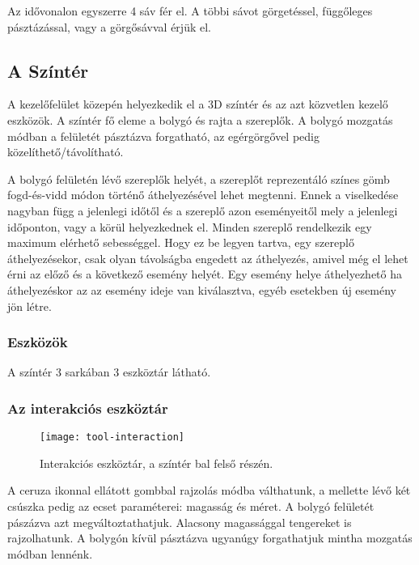 Az idővonalon egyszerre 4 sáv fér el. A többi sávot görgetéssel, függőleges pásztázással, vagy a görgősávval érjük el.

\subsection{A Színtér} \label{section:ui-scene}

A kezelőfelület közepén helyezkedik el a 3D színtér és az azt közvetlen kezelő eszközök. A színtér fő eleme a bolygó és rajta a szereplők. A bolygó mozgatás módban a felületét pásztázva forgatható, az egérgörgővel pedig közelíthető/távolítható.

A bolygó felületén lévő szereplők helyét, a szereplőt reprezentáló színes gömb fogd-és-vidd módon történő áthelyezésével lehet megtenni. Ennek a viselkedése nagyban függ a jelenlegi időtől és a szereplő azon eseményeitől mely a jelenlegi időponton, vagy a körül helyezkednek el. Minden szereplő rendelkezik egy maximum elérhető sebességgel. Hogy ez be legyen tartva, egy szereplő áthelyezésekor, csak olyan távolságba engedett az áthelyezés, amivel még el lehet érni az előző és a következő esemény helyét. Egy esemény helye áthelyezhető ha áthelyezéskor az az esemény ideje van kiválasztva, egyéb esetekben új esemény jön létre.


\subsubsection{Eszközök} \label{section:ui-utilities}

A színtér 3 sarkában 3 eszköztár látható.

\subsubsection{Az interakciós eszköztár}

\begin{figure}[h!]
	\centering
	\texttt{[image: tool-interaction]}
	\caption{Interakciós eszköztár, a színtér bal felső részén.}
	\label{fig:tool-interaction}
\end{figure}

A ceruza ikonnal ellátott gombbal rajzolás módba válthatunk, a mellette lévő két csúszka pedig az ecset paraméterei: magasság és méret. A bolygó felületét pászázva azt megváltoztathatjuk. Alacsony magassággal tengereket is rajzolhatunk. A bolygón kívül pásztázva ugyanúgy forgathatjuk mintha mozgatás módban lennénk.

